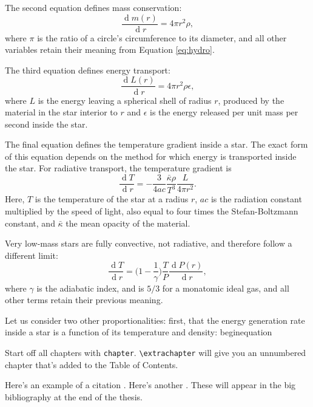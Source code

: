 \documentclass[12pt]{caltech_thesis}
\renewcommand{\d}[1]{\ensuremath{\operatorname{d}\!{#1}}}
\begin{document}
The second equation defines mass conservation:
\begin{equation}
\frac{\d m(r)}{\d r} = 4 \pi r^2 \rho,
\end{equation}
where $\pi$ is the ratio of a circle's circumference to its diameter,
and all other variables retain their meaning from Equation \ref{eq:hydro}.

The third equation defines energy transport:
\begin{equation}
\frac{\d L(r)}{\d r} = 4 \pi r^2 \rho \epsilon,
\end{equation}
where $L$ is the energy leaving a spherical shell of radius $r$, produced by the
material in the star interior to $r$ and $\epsilon$ is the energy released per unit
mass per second inside the star.

The final equation defines the temperature gradient inside a star. 
The exact form of this equation depends on the method for which energy is transported
inside the star.
For radiative transport, the temperature gradient is
\begin{equation}
\frac{\d T}{\d r} = - \frac{3}{4ac} \frac{\bar{\kappa} \rho}{T^3} \frac{L}{4\pi r^2}.
\end{equation}
Here, $T$ is the temperature of the star at a radius $r$, $ac$ is the radiation constant multiplied by the speed of light, also equal to four times the Stefan-Boltzmann
constant, and $\bar{\kappa}$ the mean opacity of the material.

Very low-mass stars are fully convective, not radiative, and therefore follow
a different limit:
\begin{equation}
\frac{\d T}{\d r} =  \bigg( 1 - \frac{1}{\gamma}\bigg)\frac{T}{P}\frac{\d P(r)}{\d r},
\end{equation}
where $\gamma$ is the adiabatic index, and is $5/3$ for a monatomic ideal gas,
and all other terms retain their previous meaning.

Let us consider two other proportionalities: first, that the energy generation rate
inside a star is a function of its temperature and density:
begin{equation}
\frac{\d T}{\d r}

Start off all chapters with \verb|chapter|.  \verb|\extrachapter| will give you an unnumbered chapter that's added to the Table of Contents. 

Here's an example of a citation \citep{GMP81}. Here's another \citep{PP98}. These will appear in the big bibliography at the end of the thesis.
\end{document}
